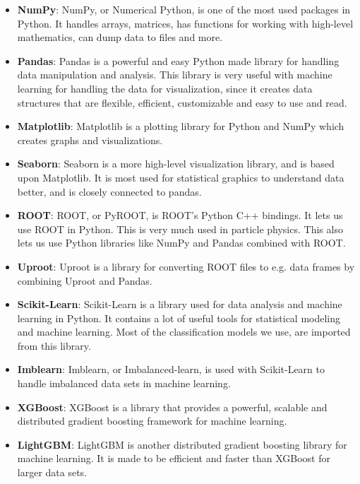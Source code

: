 \documentclass[a4paper, american, 12pt]{report}
\begin{document}
	\begin{itemize}
		\item \textbf{NumPy}: NumPy, or Numerical Python, is one of the most used packages in Python. It handles arrays, matrices, has functions for working with high-level mathematics, can dump data to files and more.
		\item \textbf{Pandas}: Pandas is a powerful and easy Python made library for handling data manipulation and analysis. This library is very useful with machine learning for handling the data for visualization, since it creates data structures that are flexible, efficient, customizable and easy to use and read.
		\item \textbf{Matplotlib}: Matplotlib is a plotting library for Python and NumPy which creates graphs and visualizations.
		\item \textbf{Seaborn}: Seaborn is a more high-level visualization library, and is based upon Matplotlib. It is most used for statistical graphics to understand data better, and is closely connected to pandas. 
		\item \textbf{ROOT}: ROOT, or PyROOT, is ROOT's Python C++ bindings. It lets us use ROOT in Python. This is very much used in particle physics. This also lets us use Python libraries like NumPy and Pandas combined with ROOT.
		\item \textbf{Uproot}: Uproot is a library for converting ROOT files to e.g. data frames by combining Uproot and Pandas.
		\item \textbf{Scikit-Learn}: Scikit-Learn\cite{scikit-learn} is a library used for data analysis and machine learning in Python. It contains a lot of useful tools for statistical modeling and machine learning. Most of the classification models we use, are imported from this library.
		\item \textbf{Imblearn}: Imblearn, or Imbalanced-learn, is used with Scikit-Learn to handle imbalanced data sets in machine learning.
		\item \textbf{XGBoost}: XGBoost is a library that provides a powerful, scalable and distributed gradient boosting framework for machine learning.
		\item \textbf{LightGBM}: LightGBM is another distributed gradient boosting library for machine learning. It is made to be efficient and faster than XGBoost for larger data sets.
	\end{itemize}
	
	
\end{document}
